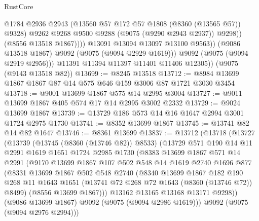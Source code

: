 \begin{lexlean}{RustCore}
\begin{coremodule}
                          @1784
                          @2936
                          @2943
                          (@13560 @57 @172 @57 @1808 (@8360 (@13565 @57)) @9328)
                          @9262
                          @9268
                          @9500
                          @9288
                          (@9075 (@9290 @2943 @2937))
                          @9298))
                      (@8556 @13518 @1867))))
                @13091
                @13094
                @13097
                @13100
                @9563))
            (@9086 @13518 @1867)
            @9092
            (@9075 (@9094 @2929 @1619)))
          @9092
          (@9075 (@9094 @2919 @2956)))
        @11391
        @11394
        @11397
        @11401
        @11406
        @12305))
    (@9075 (@9143 @13518 @82))
@13699 := @8245 @13518
@13712 := @8984 @13699 @1867 @1867 @87 @14 @575 @646 @159 @3006 @87 @1721 @3030 @3454
@13718 := @9001 @13699 @1867 @575 @14 @2995 @3004
@13727 := @9011 @13699 @1867 @405 @574 @17 @14 @2995 @3002 @2332
@13729 := @9024 @13699 @1867
@13739 := @13729 @186 @573 @14 @16 @1647 @2994 @3001 @1724 @2975 @1730
@13741 := @8352 @13699 @1867
@13745 := @13741 @82 @14 @82 @1647
@13746 := @8361 @13699
@13837 := @13712
    (@13718
      (@13727
        (@13739
          (@13745 (@8360 (@13746 @82)) @8533)
          (@13729
            @571
            @190
            @14
            @11
            @2991
            @1619
            @1651
            @1724
            @2985
            @1730
            (@8383
              @13699
              @1867
              @571
              @14
              @2991
              (@9170
                @13699
                @1867
                @107
                @502
                @548
                @14
                @1619
                @2740
                @1696
                @877
                (@8331
                  @13699
                  @1867
                  @502
                  @548
                  @2740
                  (@8340
                    @13699
                    @1867
                    @182
                    @190
                    @268
                    @11
                    @1643
                    @1651
                    (@13741 @72 @268 @72 @1643 (@8360 (@13746 @72)) @8499)
                    (@8556 @13699 @1867)))
                @13162
                @13165
                @13168
                @13171
                @9298))
            (@9086 @13699 @1867)
            @9092
            (@9075 (@9094 @2986 @1619)))
          @9092
          (@9075 (@9094 @2976 @2994)))

\end{coremodule}
\end{lexlean}
